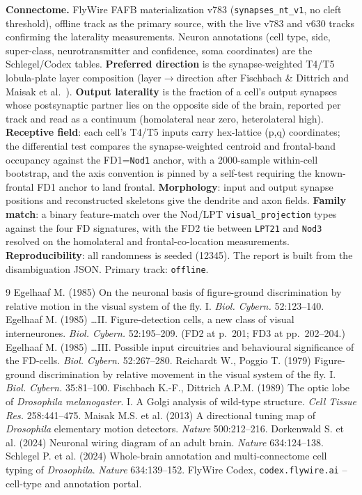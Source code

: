 \documentclass[11pt]{article}
\newcommand{\ttt}[1]{\texttt{#1}}
\begin{document}
\textbf{Connectome.} FlyWire FAFB materialization v783 (\ttt{synapses\_nt\_v1}, no cleft threshold), offline track as the primary source, with the live v783 and v630 tracks confirming the laterality measurements. Neuron annotations (cell type, side, super-class, neurotransmitter and confidence, soma coordinates) are the Schlegel/Codex tables. \textbf{Preferred direction} is the synapse-weighted T4/T5 lobula-plate layer composition (layer$\to$direction after Fischbach \& Dittrich and Maisak et al.~\cite{fd1989,maisak2013}). \textbf{Output laterality} is the fraction of a cell's output synapses whose postsynaptic partner lies on the opposite side of the brain, reported per track and read as a continuum (homolateral near zero, heterolateral high). \textbf{Receptive field}: each cell's T4/T5 inputs carry hex-lattice (p,q) coordinates; the differential test compares the synapse-weighted centroid and frontal-band occupancy against the FD1=\ttt{Nod1} anchor, with a 2000-sample within-cell bootstrap, and the axis convention is pinned by a self-test requiring the known-frontal FD1 anchor to land frontal. \textbf{Morphology}: input and output synapse positions and reconstructed skeletons give the dendrite and axon fields. \textbf{Family match}: a binary feature-match over the Nod/LPT \ttt{visual\_projection} types against the four FD signatures, with the FD2 tie between \ttt{LPT21} and \ttt{Nod3} resolved on the homolateral and frontal-co-location measurements. \textbf{Reproducibility}: all randomness is seeded (12345). The report is built from the disambiguation JSON. Primary track: \ttt{offline}.

\begin{thebibliography}{9}
 Egelhaaf M. (1985) On the neuronal basis of figure-ground discrimination by relative motion in the visual system of the fly. I. \textit{Biol. Cybern.} 52:123--140.
 Egelhaaf M. (1985) \ldots II. Figure-detection cells, a new class of visual interneurones. \textit{Biol. Cybern.} 52:195--209. (FD2 at p.~201; FD3 at pp.~202--204.)
 Egelhaaf M. (1985) \ldots III. Possible input circuitries and behavioural significance of the FD-cells. \textit{Biol. Cybern.} 52:267--280.
 Reichardt W., Poggio T. (1979) Figure-ground discrimination by relative movement in the visual system of the fly. I. \textit{Biol. Cybern.} 35:81--100.
 Fischbach K.-F., Dittrich A.P.M. (1989) The optic lobe of \textit{Drosophila melanogaster}. I. A Golgi analysis of wild-type structure. \textit{Cell Tissue Res.} 258:441--475.
 Maisak M.S. et al. (2013) A directional tuning map of \textit{Drosophila} elementary motion detectors. \textit{Nature} 500:212--216.
 Dorkenwald S. et al. (2024) Neuronal wiring diagram of an adult brain. \textit{Nature} 634:124--138.
 Schlegel P. et al. (2024) Whole-brain annotation and multi-connectome cell typing of \textit{Drosophila}. \textit{Nature} 634:139--152.
 FlyWire Codex, \texttt{codex.flywire.ai} -- cell-type and annotation portal.
\end{thebibliography}
\end{document}
